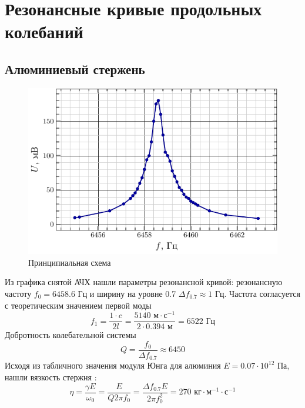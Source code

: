 \section{Резонансные кривые продольных колебаний}
\subsection{Алюминиевый стержень}
\begin{figure}[H]
	\centering
	\includegraphics[scale=1.5]{fig/al_afc}
	\caption{Принципиальная схема}
	\label{fig:chem1}
\end{figure}

Из графика снятой АЧХ нашли параметры резонансной кривой: резонансную частоту
$f_0=6458.6\text{ Гц}$ и ширину на уровне 0.7 $\Delta f_{0.7} \approx 1\text{ Гц}$. 
Частота согласуется с теоретическим значением первой моды
\begin{equation}
	f_1 = \frac{1\cdot c}{2l} = \frac{5140 \text{ м}\cdot\text{с}^{-1}}{2\cdot 0.394\text{ м}}=6522 \text{ Гц}
\end{equation}
Добротность колебательной системы
\begin{equation}
	Q = \frac{f_0}{\Delta f_{0.7}} \approx 6450
\end{equation}
Исходя из табличного значения модуля Юнга для алюминия $E=0.07\cdot10^{12}$ Па, нашли вязкость стержня  \cite[стр. 10]{met}:
\begin{equation}
	\eta = \frac{\gamma E}{\omega_0}= \frac{ E}{Q 2\pi f_0} = \frac{\Delta f_{0.7} E}{2\pi f_0^2}= 270 \text{ кг}\cdot\text{м}^{-1}\cdot\text{с}^{-1}
\end{equation}

